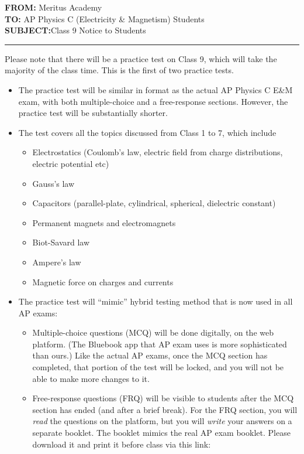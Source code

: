 \documentclass[letterpaper,11pt]{article}
\begin{document}
{\large
  \textbf{FROM:}\tabto{1.3in} Meritus Academy\\
  \textbf{TO:}\tabto{1.3in} AP Physics C (Electricity \& Magnetism) Students\\
  \textbf{SUBJECT:}\tabto{1.3in}Class 9 Notice to Students
  \par
}
\vspace{.2in}\hrule

Please note that there will be a practice test on Class 9, which will take the
majority of the class time. This is the first of two practice tests.

\begin{itemize}[itemsep=4pt,topsep=0pt,leftmargin=15pt]
\item The practice test will be similar in format as the actual AP Physics C
  E\&M exam, with both multiple-choice and a free-response sections. However,
  the practice test will be substantially shorter.
\item The test covers all the topics discussed from Class 1 to 7, which
  include
  \begin{itemize}
  \item Electrostatics (Coulomb's law, electric field from charge
    distributions, electric potential etc)
  \item Gauss's law
  \item Capacitors (parallel-plate, cylindrical, spherical, dielectric constant)
  \item Permanent magnets and electromagnets
  \item Biot-Savard law
  \item Ampere's law
  \item Magnetic force on charges and currents
  \end{itemize}

\item The practice test will ``mimic'' hybrid testing method that is now used
  in all AP exams:
  \begin{itemize}
  \item Multiple-choice questions (MCQ) will be done digitally, on the web
    platform. (The Bluebook app that AP exam uses is more sophisticated than
    ours.) Like the actual AP exams, once the MCQ section has completed, that
    portion of the test will be locked, and you will not be
    able to make more changes to it.
    
  \item Free-response questions (FRQ) will be visible to students after the
    MCQ section has ended (and after a brief break). For the FRQ section, you
    will \emph{read} the questions on the platform, but you will \emph{write}
    your answers on a separate booklet. The booklet mimics the real AP exam
    booklet. Please download it and print it before class via this link:


\end{itemize}
\end{itemize}
\end{document}
